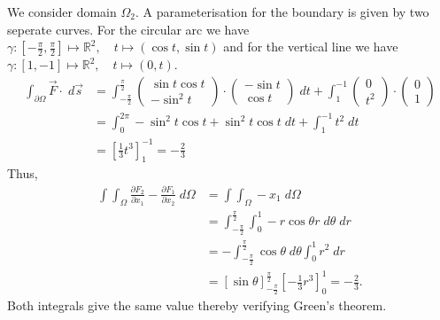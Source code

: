 \documentclass[11pt]{article}
\begin{document}
\begin{solution}
    We consider domain $\Omega_2$. A parameterisation for the boundary is given by two seperate curves. For the circular arc we have $\gamma: [-\frac{\pi}{2},\frac{\pi}{2}] \mapsto \mathbb{R}^2, \quad t\mapsto  (\cos t, \sin t)$ and for the vertical line we have  $\gamma: [1,-1] \mapsto \mathbb{R}^2, \quad t\mapsto  (0, t)$. 
    \begin{align*}
        \int_{\partial \Omega} \vec{F} \cdot \;d\vec{s} &= \int_{-\frac{\pi}{2}}^ {\frac{\pi}{2}} \begin{pmatrix}\sin t \cos t\\ -\sin^2 t \end{pmatrix} \cdot \begin{pmatrix}-\sin t \\ \cos t \end{pmatrix} \; d t + \int_1^ {-1} \begin{pmatrix}0\\t^ 2\end{pmatrix}\cdot \begin{pmatrix}0\\1\end{pmatrix}
        \\&= \int_0^{2\pi} -\sin^2 t\cos t + \sin^ 2 t \cos t \;dt + \int_{1}^ {-1} t^ 2 \;d t
        \\&= \left[\frac{1}{3} t^ 3\right]_1^ {-1} = -\frac{2}{3}
    \end{align*}
    Thus, 
    \begin{align*}
        \int \int_{\Omega} \frac{\partial F_2}{\partial x_1} - \frac{\partial F_1}{\partial x_2} \;d \Omega &= \int \int_{\Omega} -x_1 \; d\Omega
        \\&= \int_{-\frac{\pi}{2}}^ {\frac{\pi}{2}} \int_0^1 -r\cos \theta r \;d\theta\;dr
        \\&= -\int_{-\frac{\pi}{2}}^ {\frac{\pi}{2}} \cos \theta \;d \theta \int_0^1 r^ 2 \;d r
        \\&= \left[\sin \theta\right]_{-\frac{\pi}{2}}^ {\frac{\pi}{2}} \left[-\frac{1}{3}r^ 3\right]_0^{1} = -\frac{2}{3}
        .
    \end{align*}
    Both integrals give the same value thereby verifying Green's theorem.
\end{solution}
\end{document}
